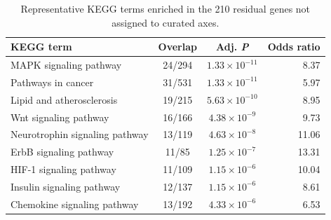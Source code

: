 \documentclass[11pt,a4paper]{article}
\begin{document}
\begin{table}[!htbp]
\centering
\caption{Representative KEGG terms enriched in the 210 residual genes not assigned to curated axes.}
\label{tab:sup_residual_kegg}
\begin{tabular}{p{5.8cm}ccr}
\toprule
\textbf{KEGG term} & \textbf{Overlap} & \textbf{Adj. \emph{P}} & \textbf{Odds ratio} \\
\midrule
MAPK signaling pathway & 24/294 & $1.33\times10^{-11}$ & 8.37 \\
Pathways in cancer & 31/531 & $1.33\times10^{-11}$ & 5.97 \\
Lipid and atherosclerosis & 19/215 & $5.63\times10^{-10}$ & 8.95 \\
Wnt signaling pathway & 16/166 & $4.38\times10^{-9}$ & 9.73 \\
Neurotrophin signaling pathway & 13/119 & $4.63\times10^{-8}$ & 11.06 \\
ErbB signaling pathway & 11/85 & $1.25\times10^{-7}$ & 13.31 \\
HIF-1 signaling pathway & 11/109 & $1.15\times10^{-6}$ & 10.04 \\
Insulin signaling pathway & 12/137 & $1.15\times10^{-6}$ & 8.61 \\
Chemokine signaling pathway & 13/192 & $4.33\times10^{-6}$ & 6.53 \\
\bottomrule
\end{tabular}
\end{table}
\end{document}
